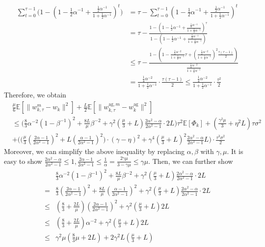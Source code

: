\documentclass[11pt]{article}
\begin{document}
\begin{align*}
    \sum_{t=0}^{\tau-1}\Big( 1-(1-\frac{1}{2}\alpha^{-1}+\frac{\frac{1}{2}\alpha^{-1}}{1+\frac{1}{2}\alpha^{-1}})^t\Big) &= \tau - \sum_{t=0}^{\tau-1} (1-\frac{1}{2}\alpha^{-1}+\frac{\frac{1}{2}\alpha^{-1}}{1+\frac{1}{2}\alpha^{-1}})^t \\
    &= \tau - \frac{1-(1-\frac{1}{2}\alpha^{-1}+\frac{\frac{1}{2}\alpha^{-1}}{1+\frac{1}{2}\alpha^{-1}})^\tau}{1-(1-\frac{1}{2}\alpha^{-1}+\frac{\frac{1}{2}\alpha^{-1}}{1+\frac{1}{2}\alpha^{-1}})} \\
    &\leq \tau - \frac{1-(1-\frac{\frac{1}{4}\alpha^{-2}}{1+\frac{1}{2}\alpha^{-1}}\tau + (\frac{\frac{1}{4}\alpha^{-2}}{1+\frac{1}{2}\alpha^{-1}})^2\frac{\tau(\tau-1)}{2})}{\frac{\frac{1}{4}\alpha^{-2}}{1+\frac{1}{2}\alpha^{-1}}} \\
    &= \frac{\frac{1}{4}\alpha^{-2}}{1+\frac{1}{2}\alpha^{-1}}\cdot\frac{\tau(\tau-1)}{2} \leq \frac{\frac{1}{4}\alpha^{-2}}{1+\frac{1}{2}\alpha^{-1}}\cdot\frac{\tau^2}{2}
\end{align*}
Therefore, we obtain
\begin{align} \label{ineqD.6-1}
    &\frac{\mu}{6}\mathbb{E}[\|w_{k, \tau}^m - w_k\|^2] + \frac{L}{2} \mathbb{E}[\|w_{k, \tau}^{\textrm{ag}, m} - w_k^{\textrm{ag}}\|^2] \nonumber\\
    &\leq \Big(\frac{8}{3}\alpha^{-2}(1-\beta^{-1})^2 +\frac{8L}{\mu}\beta^{-2} + \gamma^2(\frac{\mu}{3} + L)\frac{2\alpha^2-\alpha}{2\alpha^2-1}\cdot 2L\Big)\tau^2 \mathbb{E}[\Phi_k] + (\frac{\gamma^2\mu}{3}+\eta^2 L)\tau\sigma^2\nonumber\\
    &+ \bigg( \Big(\frac{\mu}{3} (\frac{2\alpha-1}{2\alpha^2 -1})^2 + L(\frac{\alpha-1}{2\alpha^2 -1})^2 \Big)\cdot (\gamma - \eta)^2 + \gamma^4 (\frac{\mu}{3} + L)^2 \frac{2\alpha^2 - \alpha}{2\alpha^2 - 1}L \bigg) \cdot\frac{\tau^3\sigma^2}{2}
\end{align}
Moreover, we can simplify the above inequality by replacing $\alpha, \beta$ with $\gamma, \mu$. It is easy to show $\frac{2\alpha^2-\alpha}{2\alpha^2-1} \leq 1, \frac{2\alpha-1}{2\alpha^2-1} \leq \frac{1}{\alpha} = \frac{2\gamma\mu}{3-\gamma\mu} \leq \gamma\mu$. Then, we can further show
\begin{align} \label{ineqD.6-2}
    &\frac{8}{3}\alpha^{-2}(1-\beta^{-1})^2 +\frac{8L}{\mu}\beta^{-2} + \gamma^2(\frac{\mu}{3} + L)\frac{2\alpha^2-\alpha}{2\alpha^2-1}\cdot 2L \nonumber\\
    = &\frac{8}{3}(\frac{2\alpha-1}{2\alpha^2-1})^2 +\frac{8L}{\mu}(\frac{\alpha-1}{2\alpha^2-1})^2 + \gamma^2(\frac{\mu}{3} + L)\frac{2\alpha^2-\alpha}{2\alpha^2-1}\cdot 2L \nonumber\\
    \leq &(\frac{8}{3} + \frac{2L}{\mu})(\frac{2\alpha-1}{2\alpha^2-1})^2 + \gamma^2(\frac{\mu}{3} + L)2L \nonumber\\
    \leq &(\frac{8}{3} + \frac{2L}{\mu})\alpha^{-2} + \gamma^2(\frac{\mu}{3} + L)2L \nonumber\\
    \leq &\gamma^2\mu(\frac{8}{3}\mu + 2L) + 2\gamma^2 L(\frac{\mu}{3}+L)
\end{align}
\end{document}
